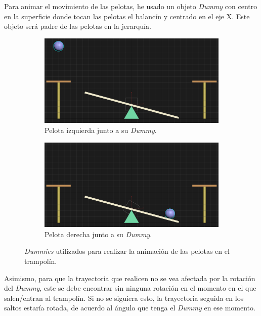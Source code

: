 Para animar el movimiento de las pelotas, he usado un objeto \textit{Dummy} con centro en la superficie donde tocan las pelotas el balancín y centrado en el eje X. Este objeto será padre de las pelotas en la jerarquía.

\begin{figure}[H]
    \centering
    \begin{subfigure}[t]{0.48\textwidth}
        \centering
        \includegraphics[width=\textwidth]{imagenes/misc/PLDummy.png}
        \caption{Pelota izquierda junto a su \textit{Dummy}.}
    \end{subfigure}
    \hfill
    \begin{subfigure}[t]{0.48\textwidth}
        \centering
        \includegraphics[width=\textwidth]{imagenes/misc/PRDummy.png}
        \caption{Pelota derecha junto a su \textit{Dummy}.}
    \end{subfigure}
    \caption{\textit{Dummies} utilizados para realizar la animación de las pelotas en el trampolín.}
\end{figure}

\bigskip

Asimismo, para que la trayectoria que realicen no se vea afectada por la rotación del \textit{Dummy}, este se debe encontrar sin ninguna rotación en el momento en el que salen/entran al trampolín. Si no se siguiera esto, la trayectoria seguida en los saltos estaría rotada, de acuerdo al ángulo que tenga el \textit{Dummy} en ese momento.

